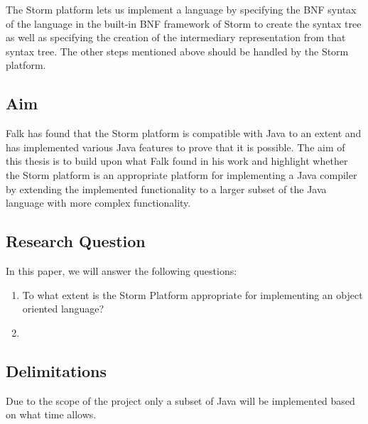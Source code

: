 \documentclass{sigchi}
\begin{document}
The Storm platform lets us implement a language by specifying the BNF syntax of the language in the built-in BNF framework of Storm to create the syntax tree as well as specifying the creation of the intermediary representation from that syntax tree. The other steps mentioned above should be handled by the Storm platform. 

\subsection{Aim}
%

Falk has found that the Storm platform is compatible with Java to an extent and has implemented various Java features to prove that it is possible\cite{}. The aim of this thesis is to build upon what Falk found in his work and highlight whether the Storm platform is an appropriate platform for implementing a Java compiler by extending the implemented functionality to a larger subset of the Java language with more complex functionality.



\subsection{Research Question}
In this paper, we will answer the following questions:

\begin{enumerate}
\item To what extent is the Storm Platform appropriate for implementing an object oriented language?
\item 
\end{enumerate}

\subsection{Delimitations}
Due to the scope of the project only a subset of Java will be implemented based on what time allows.
\end{document}
